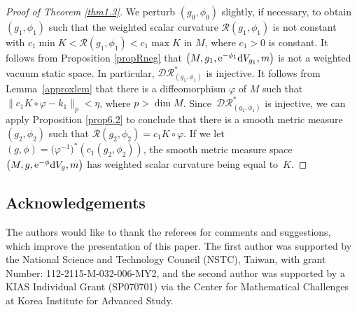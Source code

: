 \documentclass[10pt,a4paper]{amsart}
\numberwithin{equation}{section}
\begin{document}
\begin{proof}[Proof of Theorem \ref{thm1.3}]
We perturb $(g_0,\phi_0)$ slightly, if necessary, to obtain $(g_1,\phi_1)$
such that the weighted scalar curvature $\mathcal{R}(g_1,\phi_1)$ is not constant
with $c_1\min K< \mathcal{R}(g_1,\phi_1)<c_1\max K$ in $M$, where $c_1>0$ is constant. It follows from Proposition \ref{propRneg} that $\bigl(M,g_1,{\rm e}^{-\phi_1}{\rm d}V_{g_1},m\bigr)$ is not a weighted vacuum static space.
In particular, $\mathcal{DR}_{(g_1,\phi_1)}^*$ is injective. It follows from Lemma~\ref{approxlem} that there is a diffeomorphism $\varphi$ of $M$ such that $\|c_1K\circ\varphi-k_1\|_p<\eta$, where $p>\dim M$. Since~$\mathcal{DR}_{(g_1,\phi_1)}^*$ is injective,
we can apply Proposition \ref{prop6.2} to conclude that
there is a smooth metric measure $(g_2,\phi_2)$ such that $\mathcal{R}(g_2,\phi_2)=c_1K\circ \varphi$.
If we let $(g,\phi)=\bigl(\varphi^{-1}\bigr)^* (c_1(g_2,\phi_2) )$,
the smooth metric measure space $\bigl(M,g,{\rm e}^{-\phi}{\rm d}V_g,m\bigr)$ has weighted scalar curvature being equal to~$K$.
\end{proof}


\subsection*{Acknowledgements}
The authors would like to thank the referees for comments and suggestions, which improve the presentation of this paper.
The first author was supported by the National Science and Technology Council (NSTC),
Taiwan, with grant Number: 112-2115-M-032-006-MY2,
and the second author was supported by a KIAS Individual Grant (SP070701) via the Center for Mathematical Challenges at Korea Institute for Advanced Study.

\end{document}
